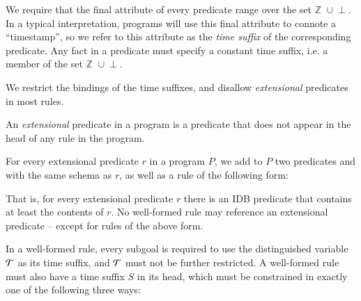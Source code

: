 We require that the final attribute of every \slang
predicate range over the set $\mathbb{Z}\,\,\cup\!\perp$.  In a typical
interpretation, \slang programs will use this final attribute to connote a
``timestamp'', so we refer to this attribute as the \emph{time suffix} of the
corresponding predicate.  Any fact in a \slang predicate must specify a
constant time suffix, i.e. a member of the set $\mathbb{Z}\,\,\cup\!\perp$.

We restrict the bindings of the time suffixes, and
disallow {\em extensional} predicates in most rules.



\begin{definition}
%
An \emph{extensional} predicate in a \slang program is a predicate
that does not appear in the head of any rule in the program.  
%
\end{definition}


For every extensional predicate $r$ in a \slang program $P$, we add to $P$ two
predicates  and  with the same schema as $r$, as well as a rule
of the following form:


That is, for every extensional predicate $r$ there is an IDB predicate  that
contains at least the contents of $r$.  No well-formed \slang rule may reference
an extensional predicate -- except for rules of the above
form. 

In a well-formed \slang rule, every subgoal is required to use the
distinguished variable $\Tau$ as its time suffix, and $\Tau$ must not be
further restricted.  A well-formed \slang rule must also have a time suffix
$S$ in its head, which must be constrained in exactly one of the following
three ways:

